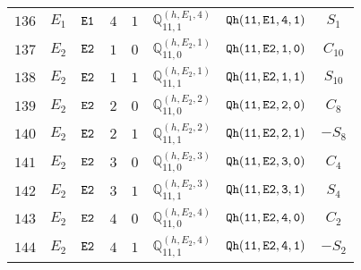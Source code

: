 \documentclass[fleqn,8pt]{jsarticle}
\begin{document}
\begin{table}[ht!]
\begin{center}
\begin{tabular}{cccccccc}
$ 136 $ & $ E_{1} $ & $ {\tt E1} $ & $ 4 $ & $ 1 $ & $ \mathbb{Q}_{11,1}^{(h,E_{1},4)} $ & $ {\tt Qh(11,E1,4,1)} $ & $ S_{1} $ \\
$ 137 $ & $ E_{2} $ & $ {\tt E2} $ & $ 1 $ & $ 0 $ & $ \mathbb{Q}_{11,0}^{(h,E_{2},1)} $ & $ {\tt Qh(11,E2,1,0)} $ & $ C_{10} $ \\
$ 138 $ & $ E_{2} $ & $ {\tt E2} $ & $ 1 $ & $ 1 $ & $ \mathbb{Q}_{11,1}^{(h,E_{2},1)} $ & $ {\tt Qh(11,E2,1,1)} $ & $ S_{10} $ \\
$ 139 $ & $ E_{2} $ & $ {\tt E2} $ & $ 2 $ & $ 0 $ & $ \mathbb{Q}_{11,0}^{(h,E_{2},2)} $ & $ {\tt Qh(11,E2,2,0)} $ & $ C_{8} $ \\
$ 140 $ & $ E_{2} $ & $ {\tt E2} $ & $ 2 $ & $ 1 $ & $ \mathbb{Q}_{11,1}^{(h,E_{2},2)} $ & $ {\tt Qh(11,E2,2,1)} $ & $ - S_{8} $ \\
$ 141 $ & $ E_{2} $ & $ {\tt E2} $ & $ 3 $ & $ 0 $ & $ \mathbb{Q}_{11,0}^{(h,E_{2},3)} $ & $ {\tt Qh(11,E2,3,0)} $ & $ C_{4} $ \\
$ 142 $ & $ E_{2} $ & $ {\tt E2} $ & $ 3 $ & $ 1 $ & $ \mathbb{Q}_{11,1}^{(h,E_{2},3)} $ & $ {\tt Qh(11,E2,3,1)} $ & $ S_{4} $ \\
$ 143 $ & $ E_{2} $ & $ {\tt E2} $ & $ 4 $ & $ 0 $ & $ \mathbb{Q}_{11,0}^{(h,E_{2},4)} $ & $ {\tt Qh(11,E2,4,0)} $ & $ C_{2} $ \\
$ 144 $ & $ E_{2} $ & $ {\tt E2} $ & $ 4 $ & $ 1 $ & $ \mathbb{Q}_{11,1}^{(h,E_{2},4)} $ & $ {\tt Qh(11,E2,4,1)} $ & $ - S_{2} $ \\
 \hline \hline
\end{tabular}
\end{center}
\end{table}
\end{document}
